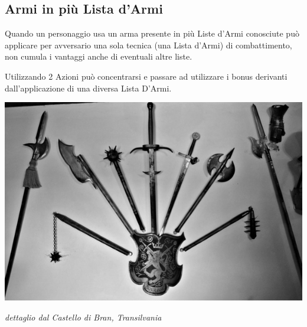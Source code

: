 \begin{multicols}{2}
\subsection{Armi in più Lista d'Armi}\label{listaarmiinpiuliste}

Quando un personaggio usa un arma presente in più Liste d'Armi conosciute può applicare per avversario una sola tecnica (una Lista d'Armi) di combattimento, non cumula i vantaggi anche di eventuali altre liste.

Utilizzando 2 Azioni può concentrarsi e passare ad utilizzare i bonus derivanti dall'applicazione di una diversa Lista D'Armi.

\end{multicols}

\vfill

\begin{center}
\includegraphics[width=0.95\linewidth]{immagini/brancastle.png}

\emph{dettaglio dal Castello di Bran, Transilvania}
\end{center}

\pagebreak

